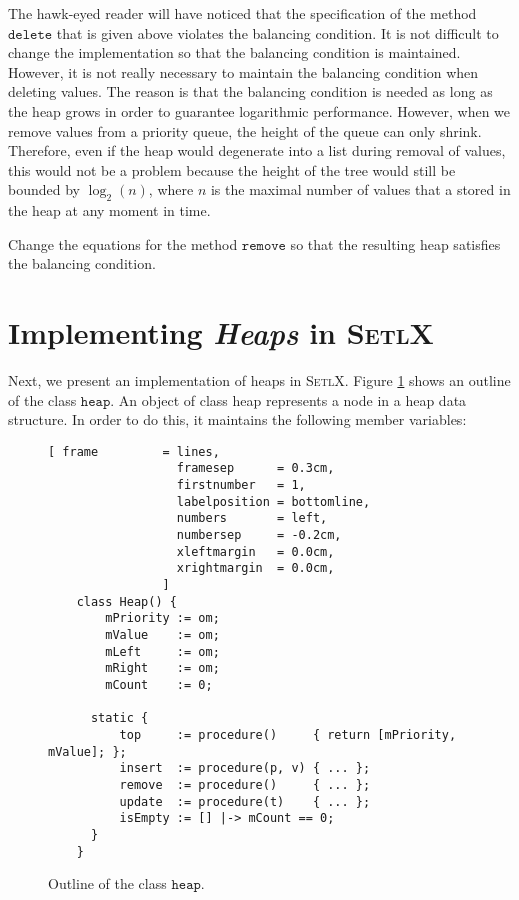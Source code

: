 The hawk-eyed reader will have noticed that the specification of the method $\texttt{delete}$ that is given
above violates the balancing condition.  It is not difficult to change the implementation so that
the balancing condition is maintained.  However, it is not really necessary to maintain the
balancing condition when deleting values.  The reason is that the balancing condition is needed as
long as the heap grows in order to guarantee logarithmic  performance.  However, when we remove
values from a priority queue, the height of the queue can only shrink.  Therefore, even if the heap
would degenerate into a list during removal of values, this would not be a problem because the
height of the tree would still be bounded by $\log_2(n)$, where $n$ is the maximal number of
values that a stored in the heap at any moment in time.

\exercise
Change the equations for the method $\texttt{remove}$ so that the resulting heap satisfies the
balancing condition.



\section[Implementation]{Implementing \textsl{Heaps} in \textsc{SetlX}}
Next, we present an implementation of heaps in \textsc{SetlX}. 
Figure \ref{fig:heap.stlx-outline} shows an outline of the class $\texttt{heap}$.  An object of class
heap represents a node in a heap data structure. In order to do this, it maintains the following
member variables:
\begin{figure}[!hbt]
\centering
\begin{Verbatim}[ frame         = lines, 
                  framesep      = 0.3cm, 
                  firstnumber   = 1,
                  labelposition = bottomline,
                  numbers       = left,
                  numbersep     = -0.2cm,
                  xleftmargin   = 0.0cm,
                  xrightmargin  = 0.0cm,
                ]
    class Heap() {
        mPriority := om;
        mValue    := om;
        mLeft     := om;
        mRight    := om;
        mCount    := 0;
    
      static {
          top     := procedure()     { return [mPriority, mValue]; };
          insert  := procedure(p, v) { ... };
          remove  := procedure()     { ... };
          update  := procedure(t)    { ... };
          isEmpty := [] |-> mCount == 0;
      }
    }
\end{Verbatim}
\vspace*{-0.3cm}
\caption{Outline of the class $\texttt{heap}$.}
\label{fig:heap.stlx-outline}
\end{figure}

